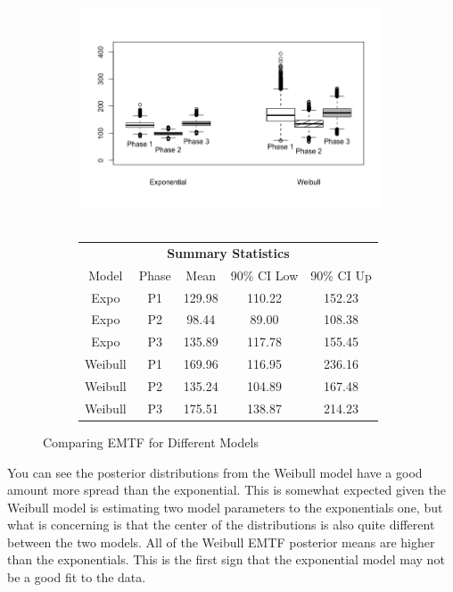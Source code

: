 \documentclass[12pt]{article}
\begin{document}
\begin{figure}[h!]
\centering
\begin{subfigure}{.5\textwidth}
  \centering
      \includegraphics[width=9cm, height=7cm]{Boxplots}
\end{subfigure}%
\begin{subfigure}{.5\textwidth}
  \center
  \begin{tabular}{|c|c|c|c|c|}
  \multicolumn{5}{c}{\textbf{Summary Statistics}} \\
  \cline{1-5}
  Model & Phase & Mean & 90\% CI Low & 90\% CI Up \\
  \hline
  Expo & P1   & 129.98   & 110.22 &  152.23 \\
  Expo & P2   & 98.44  & 89.00 &  108.38  \\
  Expo & P3   & 135.89   & 117.78 &  155.45 \\
  Weibull & P1   & 169.96  & 116.95 & 236.16 \\
  Weibull & P2   & 135.24   & 104.89 & 167.48 \\
  Weibull & P3   & 175.51   & 138.87 & 214.23 \\
  \hline
  \end{tabular}
\end{subfigure}
\caption{Comparing EMTF for Different Models}
\label{fig:test}
\end{figure}

You can see the posterior distributions from the Weibull model have a good
amount more spread than the exponential.  This is somewhat expected given the
Weibull model is estimating two model parameters to the exponentials one, but
what is concerning is that the center of the distributions is also quite
different between the two models.  All of the Weibull EMTF posterior means are
higher than the exponentials.  This is the first sign that the exponential model
may not be a good fit to the data.
\end{document}
